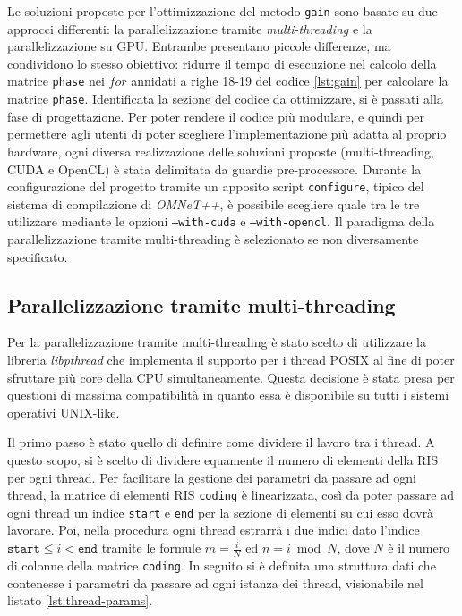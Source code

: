 Le soluzioni proposte per l'ottimizzazione del metodo \texttt{gain} sono basate
su due approcci differenti: la parallelizzazione tramite \textit{multi-threading}
e la parallelizzazione su GPU. Entrambe presentano piccole differenze, ma
condividono lo stesso obiettivo: ridurre il tempo di esecuzione nel calcolo della
matrice \texttt{phase} nei $for$ annidati a righe 18-19 del codice
\ref{lst:gain} per calcolare la matrice \texttt{phase}. Identificata la sezione
del codice da ottimizzare, si è passati alla fase di progettazione. Per poter
rendere il codice più modulare, e quindi per permettere agli utenti di poter scegliere
l'implementazione più adatta al proprio hardware, ogni diversa realizzazione
delle soluzioni proposte (multi-threading, CUDA e OpenCL) è stata delimitata da guardie
pre-processore. Durante la configurazione del progetto tramite un apposito
script \texttt{configure}, tipico del sistema di compilazione di \textit{OMNeT++},
è possibile scegliere quale tra le tre utilizzare mediante le opzioni \texttt{--with-cuda}
e \texttt{--with-opencl}. Il paradigma della parallelizzazione tramite multi-threading
è selezionato se non diversamente specificato.

\subsection{Parallelizzazione tramite multi-threading}
\label{subsec:multithreading}

Per la parallelizzazione tramite multi-threading è stato scelto di utilizzare la
libreria \textit{libpthread} che implementa il supporto per i thread POSIX al fine
di poter sfruttare più core della CPU simultaneamente. Questa decisione è stata
presa per questioni di massima compatibilità in quanto essa è disponibile su
tutti i sistemi operativi UNIX-like.

Il primo passo è stato quello di definire come dividere il lavoro tra i thread. A
questo scopo, si è scelto di dividere equamente il numero di elementi della RIS
per ogni thread. Per facilitare la gestione dei parametri da passare ad ogni thread,
la matrice di elementi RIS \texttt{coding} è linearizzata, così da poter passare
ad ogni thread un indice \texttt{start} e \texttt{end} per la sezione di
elementi su cui esso dovrà lavorare. Poi, nella procedura ogni thread estrarrà i
due indici dato l'indice $\texttt{start}\le i < \texttt{end}$ tramite le formule
$m = \frac{i}{N}$ ed $n = i \bmod N$, dove $N$ è il numero di colonne della matrice
\texttt{coding}. In seguito si è definita una struttura dati che contenesse i parametri
da passare ad ogni istanza dei thread, visionabile nel listato
\ref{lst:thread-params}.

